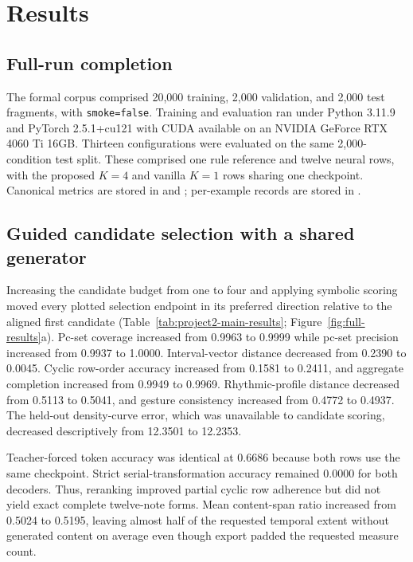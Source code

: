 \section{Results}
\label{sec:results}

\subsection{Full-run completion}

The formal corpus comprised 20,000 training, 2,000 validation, and 2,000 test fragments, with \texttt{smoke=false}. Training and evaluation ran under Python 3.11.9 and PyTorch 2.5.1+cu121 with CUDA available on an NVIDIA GeForce RTX 4060 Ti 16GB. Thirteen configurations were evaluated on the same 2,000-condition test split. These comprised one rule reference and twelve neural rows, with the proposed $K=4$ and vanilla $K=1$ rows sharing one checkpoint. Canonical metrics are stored in  and ; per-example records are stored in .

\subsection{Guided candidate selection with a shared generator}

Increasing the candidate budget from one to four and applying symbolic scoring moved every plotted selection endpoint in its preferred direction relative to the aligned first candidate (Table~\ref{tab:project2-main-results}; Figure~\ref{fig:full-results}a). Pc-set coverage increased from 0.9963 to 0.9999 while pc-set precision increased from 0.9937 to 1.0000. Interval-vector distance decreased from 0.2390 to 0.0045. Cyclic row-order accuracy increased from 0.1581 to 0.2411, and aggregate completion increased from 0.9949 to 0.9969. Rhythmic-profile distance decreased from 0.5113 to 0.5041, and gesture consistency increased from 0.4772 to 0.4937. The held-out density-curve error, which was unavailable to candidate scoring, decreased descriptively from 12.3501 to 12.2353.

Teacher-forced token accuracy was identical at 0.6686 because both rows use the same checkpoint. Strict serial-transformation accuracy remained 0.0000 for both decoders. Thus, reranking improved partial cyclic row adherence but did not yield exact complete twelve-note forms. Mean content-span ratio increased from 0.5024 to 0.5195, leaving almost half of the requested temporal extent without generated content on average even though export padded the requested measure count.

